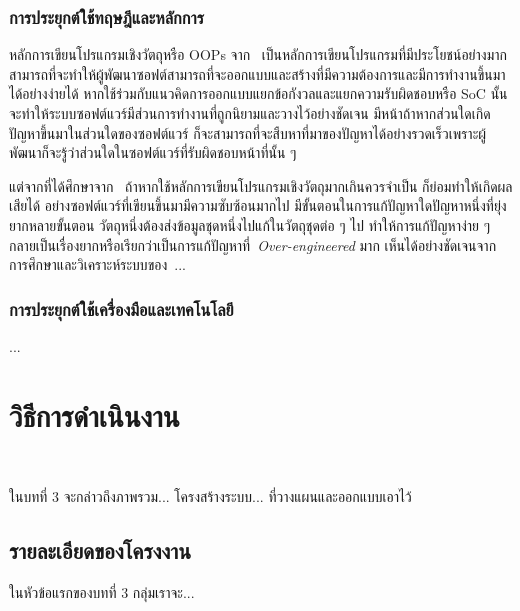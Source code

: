\documentclass[12pt,one side,openright,a4paper]{cpe-thesis-th}
\newcommand{\thaijustify}[1]{%
  \par\hspace{30pt}\justifying
  #1
}
\begin{document}
    \subsection{การประยุกต์ใช้ทฤษฎีและหลักการ}
        \thaijustify{
            หลักการเขียนโปรแกรมเชิงวัตถุหรือ OOPs จาก~\cite{booch87, meyer2000, apollo22oop} เป็นหลักการเขียนโปรแกรมที่มีประโยชน์อย่างมาก สามารถที่จะทำให้ผู้พัฒนาซอฟต์สามารถที่จะออกแบบและสร้างที่มีความต้องการและมีการทำงานขึ้นมาได้อย่างง่ายได้ หากใช้ร่วมกับแนวคิดการออกแบบแยกข้อกังวลและแยกความรับผิดชอบหรือ SoC นั้น จะทำให้ระบบซอฟต์แวร์มีส่วนการทำงานที่ถูกนิยามและวางไว้อย่างชัดเจน มีหน้าถ้าหากส่วนใดเกิดปัญหาขึ้นมาในส่วนใดของซอฟต์แวร์ ก็จะสามารถที่จะสืบหาที่มาของปัญหาได้อย่างรวดเร็วเพราะผู้พัฒนาก็จะรู้ว่าส่วนใดในซอฟต์แวร์ที่รับผิดชอบหน้าที่นั้น ๆ~\cite{nattawat20pgs, wikipedia04soc}
        }
        \thaijustify{
            แต่จากที่ได้ศึกษาจาก~\cite{thomas99pragmatic, fowler13oop, nattawat20pgs} ถ้าหากใช้หลักการเขียนโปรแกรมเชิงวัตถุมากเกินควรจำเป็น ก็ย่อมทำให้เกิดผลเสียได้ อย่างซอฟต์แวร์ที่เขียนขึ้นมามีความซับซ้อนมากไป มีขั้นตอนในการแก้ปัญหาใดปัญหาหนึ่งที่ยุ่งยากหลายขั้นตอน วัตถุหนึ่งต้องส่งข้อมูลชุดหนึ่งไปแก้ในวัตถุชุดต่อ ๆ ไป ทำให้การแก้ปัญหาง่าย ๆ กลายเป็นเรื่องยากหรือเรียกว่าเป็นการแก้ปัญหาที่~\textit{Over-engineered} มาก เห็นได้อย่างชัดเจนจากการศึกษาและวิเคราะห์ระบบของ~\cite{nattawat20pgs}...
        }
    \subsection{การประยุกต์ใช้เครื่องมือและเทคโนโลยี}
       \thaijustify{
            ...
        }
\pagebreak


\chapter{วิธีการดำเนินงาน}
 \\
\thaijustify{
    ในบทที่ 3 จะกล่าวถึงภาพรวม... โครงสร้างระบบ... ที่วางแผนและออกแบบเอาไว้
}
\section{รายละเอียดของโครงงาน}
    \thaijustify{
        ในหัวข้อแรกของบทที่ 3 กลุ่มเราจะ...
    }
\end{document}
